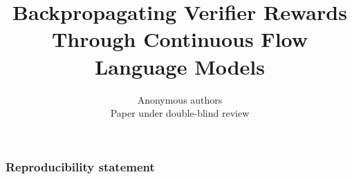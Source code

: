 \documentclass{article}
\title{Backpropagating Verifier Rewards Through Continuous Flow Language Models}
\author{Anonymous authors\\ Paper under double-blind review}
\begin{document}
\maketitle











\subsubsection*{Reproducibility statement}





\appendix
\raggedbottom %






\end{document}
